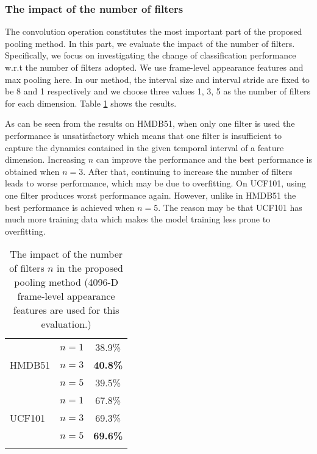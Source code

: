 \documentclass[journal]{IEEEtran}
\begin{document}
\subsubsection{The impact of the number of filters}
The convolution operation constitutes the most important part of the proposed pooling method. In this part, we evaluate the impact of the number of filters. Specifically, we focus on investigating the change of classification performance w.r.t the number of filters adopted. We use frame-level appearance features and max pooling here. In our method, the interval size and interval stride are fixed to be 8 and 1 respectively and we choose three values 1, 3, 5 as the number of filters for each dimension.
%
Table \ref{tab:cov-neurons} shows the results.
%
%

As can be seen from the results on HMDB51, when only one filter is used the performance is unsatisfactory which means that one filter is insufficient to capture the dynamics contained in the given temporal interval of a feature dimension. Increasing $n$ can improve the performance and the best performance is obtained when $n=3$. After that, continuing to increase the number of filters leads to worse performance, which may be due to overfitting. On UCF101, using one filter produces worst performance again. However, unlike in HMDB51 the best performance is achieved when $n=5$. The reason may be that UCF101 has much more training data which makes the model training less prone to overfitting.

\begin{table}[h]\normalsize
 \caption{The impact of the number of filters $n$ in the proposed pooling method (4096-D frame-level appearance features are used for this evaluation.)}
  \centering
  \renewcommand{\arraystretch}{1.2}
    \begin{tabular}{l|cc}
    \hline
    \multirow{3}{*}{HMDB51} & $n=1$ & 38.9\% \\
    & $n=3$ & \textbf{40.8\%} \\
    & $n=5$ & 39.5\% \\
    \hline \hline
	\multirow{3}{*}{ UCF101} & $n=1$ & 67.8\% \\
    & $n=3$ & 69.3\% \\
    & $n=5$ & \textbf{69.6\%} \\
    \hline \noalign{\smallskip}

    \end{tabular}%

  \label{tab:cov-neurons}%
\end{table}%
\end{document}

